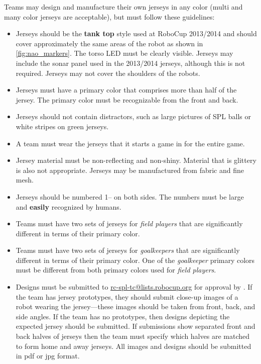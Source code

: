 Teams may design and manufacture their own jerseys in any color (multi and many color jerseys are acceptable), but must follow these guidelines:
\begin{itemize}
\item Jerseys should be the \textbf{tank top} style used at RoboCup 2013/2014 and should cover approximately the same areas of the robot as shown in \cref{fig:nao_markers}. The torso LED must be clearly visible. Jerseys may include the sonar panel used in the 2013/2014 jerseys, although this is not required. Jerseys may not cover the shoulders of the robots.
\item Jerseys must have a primary color that comprises more than half of the jersey.  The primary color must be recognizable from the front and back.
\item Jerseys should not contain distractors, such as large pictures of SPL balls or white stripes on green jerseys.
\item A team must wear the jerseys that it starts a game in for the entire game.
\item Jersey material must be non-reflecting and non-shiny.  Material that is glittery is also not appropriate.  Jerseys may be manufactured from fabric and fine mesh.
\item Jerseys should be numbered 1--{\MaxJerseyNumber} on both sides.  The numbers must be large and {\bf easily} recognized by humans.
\item Teams must have two sets of jerseys for \emph{field players} that are significantly different in terms of their primary color.
\item Teams must have two sets of jerseys for \emph{goalkeepers} that are significantly different in terms of their primary color.  One of the \emph{goalkeeper} primary colors must be different from both primary colors used for \emph{field players}.
\item Designs must be submitted to \url{rc-spl-tc@lists.robocup.org} for approval by \DTMdate{\JerseyApproveSubmissionDate}. If the team has jersey prototypes, they should submit close-up images of a robot wearing the jersey---these images should be taken from front, back, and side angles.  If the team has no prototypes, then designs depicting the expected jersey should be submitted.  If submissions show separated front and back halves of jerseys then the team must specify which halves are matched to form home and away jerseys.  All images and designs should be submitted in pdf or jpg format.
\end{itemize}

